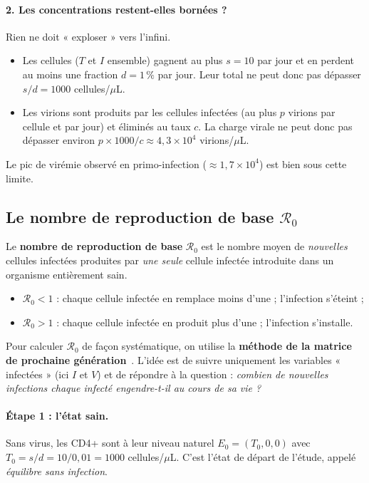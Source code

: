 \documentclass[11pt,a4paper]{report}
\theoremstyle{plain}
\theoremstyle{definition}
\theoremstyle{remark}
\newcommand{\Rzero}{\mathcal{R}_0}
\begin{document}
\paragraph{2. Les concentrations restent-elles bornées ?} Rien ne doit « exploser » vers l'infini.
\begin{itemize}
    \item Les cellules ($T$ et $I$ ensemble) gagnent au plus $s=10$ par jour et en perdent au moins une fraction $d=1\,\%$ par jour. Leur total ne peut donc pas dépasser $s/d=1000$ cellules/$\mu$L.
    \item Les virions sont produits par les cellules infectées (au plus $p$ virions par cellule et par jour) et éliminés au taux $c$. La charge virale ne peut donc pas dépasser environ $p\times1000/c\approx4{,}3\times10^{4}$ virions/$\mu$L.
\end{itemize}
Le pic de virémie observé en primo-infection ($\approx1{,}7\times10^{4}$) est bien sous cette limite.

\subsection*{Le nombre de reproduction de base $\Rzero$}

\begin{cadreconcept}[Définition de $\Rzero$]
Le \textbf{nombre de reproduction de base} $\Rzero$ est le nombre moyen de \emph{nouvelles} cellules infectées produites par \emph{une seule} cellule infectée introduite dans un organisme entièrement sain.
\begin{itemize}
    \item $\Rzero<1$ : chaque cellule infectée en remplace moins d'une ; l'infection s'éteint ;
    \item $\Rzero>1$ : chaque cellule infectée en produit plus d'une ; l'infection s'installe.
\end{itemize}
\end{cadreconcept}

Pour calculer $\Rzero$ de façon systématique, on utilise la \textbf{méthode de la matrice de prochaine génération}~\cite{diekmann1990,vandendriessche2002}. L'idée est de suivre uniquement les variables « infectées » (ici $I$ et $V$) et de répondre à la question : \emph{combien de nouvelles infections chaque infecté engendre-t-il au cours de sa vie ?}

\paragraph{Étape 1 : l'état sain.} Sans virus, les CD4+ sont à leur niveau naturel $E_0=(T_0,0,0)$ avec $T_0=s/d=10/0{,}01=1000$ cellules/$\mu$L. C'est l'état de départ de l'étude, appelé \emph{équilibre sans infection}.
\end{document}
